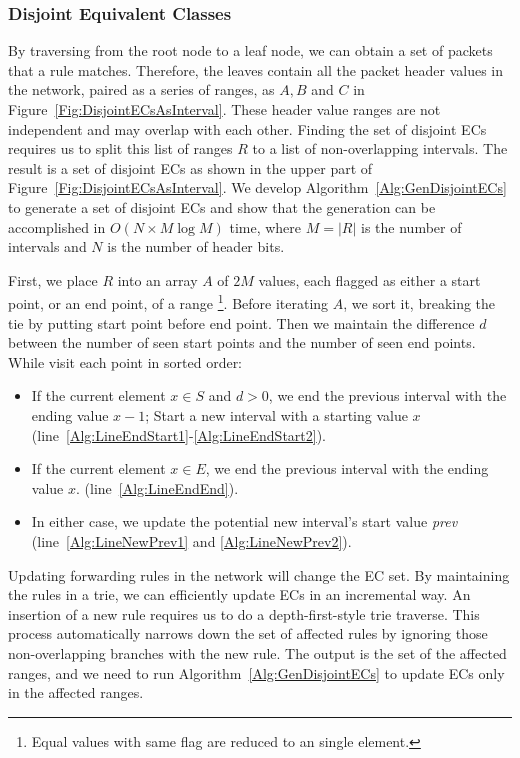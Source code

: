 
\subsubsection{Disjoint Equivalent Classes}
By traversing from the root node to a leaf node, we can obtain a set of packets that a rule matches.
Therefore, the leaves contain all the packet header values in the network, paired as a series of ranges, as $A, B$ and $C$ in Figure~\ref{Fig:DisjointECsAsInterval}.
These header value ranges are not independent and may overlap with each other.
Finding the set of disjoint ECs requires us to split this list of ranges $R$ to a list of non-overlapping intervals. The result is a set of disjoint ECs as shown in the upper part of Figure~\ref{Fig:DisjointECsAsInterval}. 
We develop Algorithm~\ref{Alg:GenDisjointECs} to generate a set of disjoint ECs and show that the generation can be accomplished in $O(N \times M\log M)$ time,
where $M=|R|$ is the number of intervals and $N$ is the number of header bits.

First, we place $R$ into an array $A$ of $2M$ values,
each flagged as either a start point, or an end point, of a range
\footnote{Equal values with same flag are reduced to an single element.}.
Before iterating $A$, we sort it, breaking the tie by putting start point before end point.
Then we maintain the difference $d$ between the number of seen start points and
the number of seen end points. While visit each point in sorted order:
\begin{itemize}
\item If the current element $x \in S$ and $d > 0$,
        we end the previous interval with the ending value $x - 1$;
        Start a new interval with a starting value $x$
        (line~\ref{Alg:LineEndStart1}-\ref{Alg:LineEndStart2}).
\item If the current element $x \in E$, we end the previous interval with the ending value $x$.
        (line~\ref{Alg:LineEndEnd}).
\item In either case, we update the potential new interval's start value \textit{prev}
        (line~\ref{Alg:LineNewPrev1} and \ref{Alg:LineNewPrev2}).
\end{itemize}

Updating forwarding rules in the network will change the EC set.
By maintaining the rules in a trie, we can efficiently update ECs in an incremental way. An insertion of a new rule requires us to do a depth-first-style trie traverse. This process automatically narrows down the set of affected rules by ignoring those non-overlapping branches with the new rule.
The output is the set of the affected ranges, and we need to run Algorithm~\ref{Alg:GenDisjointECs} to update ECs only in the affected ranges.


